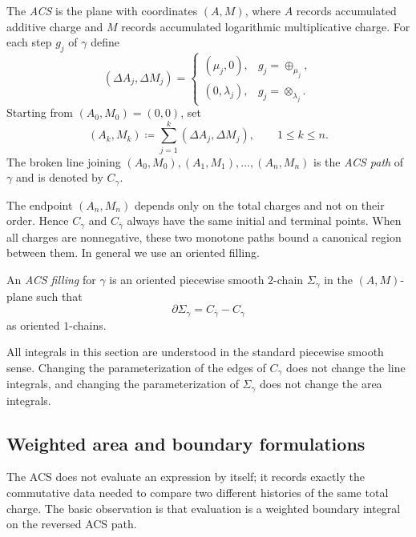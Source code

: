 \begin{definition}\label{def:acs-path}
The \emph{ACS} is the plane with coordinates $(A,M)$, where $A$ records accumulated additive charge and $M$ records accumulated logarithmic multiplicative charge. For each step $g_j$ of $\gamma$ define
\[
(\Delta A_j,\Delta M_j)=
\begin{cases}
(\mu_j,0), & g_j=\oplus_{\mu_j},\\[4pt]
(0,\lambda_j), & g_j=\otimes_{\lambda_j}.
\end{cases}
\]
Starting from $(A_0,M_0)=(0,0)$, set
\[
(A_k,M_k)\coloneqq\sum_{j=1}^k(\Delta A_j,\Delta M_j),
\qquad 1\le k\le n.
\]
The broken line joining $(A_0,M_0),(A_1,M_1),\dots,(A_n,M_n)$ is the \emph{ACS path} of $\gamma$ and is denoted by $C_\gamma$.
\end{definition}

The endpoint $(A_n,M_n)$ depends only on the total charges and not on their order. Hence $C_\gamma$ and $C_{\bar\gamma}$ always have the same initial and terminal points. When all charges are nonnegative, these two monotone paths bound a canonical region between them. In general we use an oriented filling.

\begin{definition}\label{def:acs-filling}
An \emph{ACS filling} for $\gamma$ is an oriented piecewise smooth $2$-chain $\Sigma_\gamma$ in the $(A,M)$-plane such that
\begin{equation}\label{eq:acs-filling-boundary}
\partial\Sigma_\gamma=C_{\bar\gamma}-C_\gamma
\end{equation}
as oriented $1$-chains.
\end{definition}

All integrals in this section are understood in the standard piecewise smooth sense. Changing the parameterization of the edges of $C_\gamma$ does not change the line integrals, and changing the parameterization of $\Sigma_\gamma$ does not change the area integrals.

\subsection{Weighted area and boundary formulations}\label{subsec:acs-area-boundary}

The ACS does not evaluate an expression by itself; it records exactly the commutative data needed to compare two different histories of the same total charge. The basic observation is that evaluation is a weighted boundary integral on the reversed ACS path.

